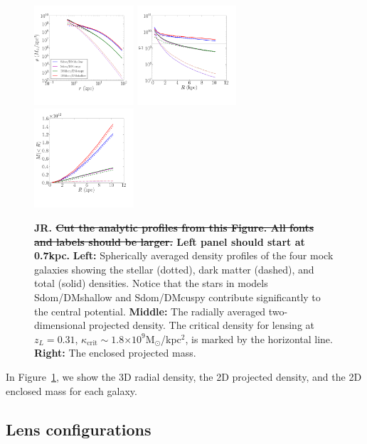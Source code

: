 \documentclass[galley,usenatbib]{mn2e}
\newcommand{\Msun}{\ensuremath{\mathrm{M}_\odot}}
\newcommand{\figref}[1] {Figure~\ref{#1}}
\newcommand{\e}[1]{\ensuremath{\times 10^{#1}}}
\begin{document}
\begin{figure}
\includegraphics[width=0.33\textwidth]{MockGalProfile-a.pdf} 
\includegraphics[width=0.33\textwidth]{MockGalProfile-b.pdf} 
\includegraphics[width=0.33\textwidth]{MockGalProfile-c.pdf}
\caption{{\bf JR. \sout{Cut the analytic profiles from this Figure. All fonts and labels should be larger.} Left panel should start at 0.7kpc.}
\textbf{Left:} 
Spherically averaged density profiles of the four mock galaxies showing the stellar (dotted), dark matter (dashed),
and total (solid) densities. Notice that the stars in models Sdom/DMshallow and Sdom/DMcuspy contribute significantly to the central potential. 
\textbf{Middle:} 
The radially averaged two-dimensional projected density.
The critical density for lensing at $z_L=0.31$, $\kappa_\mathrm{crit}\sim 1.8\e{9}$\Msun/kpc$^2$, is marked by the horizontal line. 
\textbf{Right:}
The enclosed projected mass.
}
\label{mock galaxies}
\end{figure}

In \figref{mock galaxies}, we show the 3D radial density, 
the 2D projected density, and the 2D enclosed mass for each
galaxy.

\subsection{Lens configurations}\label{sec:lensconfig} %
\end{document}
